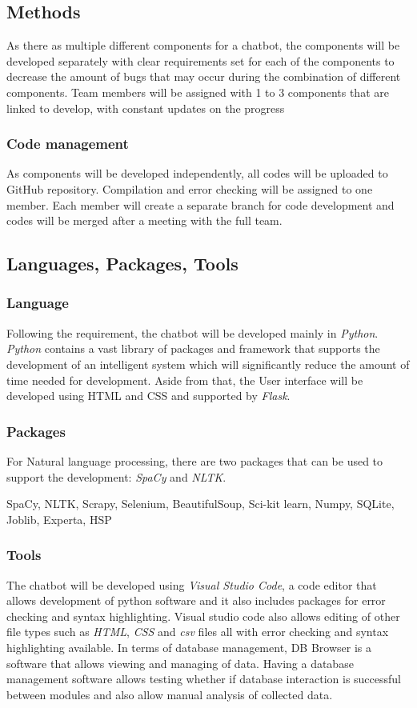 \documentclass[11pt]{article}
\begin{document}
\subsection{Methods}
As there as multiple different components for a chatbot, the components will be developed separately with clear requirements set for each of the components to decrease the amount of bugs that may occur during the combination of different components. Team members will be assigned with 1 to 3 components that are linked to develop, with constant updates on the progress

\subsubsection{Code management}
As components will be developed independently, all codes will be uploaded to GitHub repository. Compilation and error checking will be assigned to one member. Each member will create a separate branch for code development and codes will be merged after a meeting with the full team.
             
\subsection{Languages, Packages, Tools}

\subsubsection{Language}
Following the requirement, the chatbot will be developed mainly in \textit{Python}. \textit{Python} contains a vast library of packages and framework that supports the development of an intelligent system which will significantly reduce the amount of time needed for development. Aside from that, the User interface will be developed using HTML and CSS and supported by \textit{Flask}.

\subsubsection{Packages}
For Natural language processing, there are two packages that can be used to support the development: \textit{SpaCy} and \textit{NLTK}.

SpaCy, NLTK, Scrapy, Selenium, BeautifulSoup, Sci-kit learn, Numpy, SQLite, Joblib, Experta, HSP

\subsubsection{Tools}
The chatbot will be developed using \textit{Visual Studio Code}, a code editor that allows development of python software and it also includes packages for error checking and syntax highlighting. Visual studio code also allows editing of other file types such as \textit{HTML}, \textit{CSS} and \textit{csv} files all with error checking and syntax highlighting available. In terms of database management, DB Browser is a software that allows viewing and managing of data. Having a database management software allows testing whether if database interaction is successful between modules and also allow manual analysis of collected data.
\end{document}
